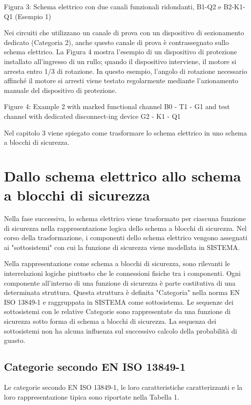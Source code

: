 \documentclass[a4paper,11pt]{article}
\begin{document}
    Figura 3: Schema elettrico con due canali funzionali ridondanti, B1-Q2 e B2-K1-Q1 (Esempio 1)

    \par\medskip\noindent Nei circuiti che utilizzano un canale di prova con un dispositivo di sezionamento dedicato (Categoria 2), anche questo canale di prova è contrassegnato sullo schema elettrico. La Figura 4 mostra l'esempio di un dispositivo di protezione installato all'ingresso di un rullo; quando il dispositivo interviene, il motore si arresta entro 1/3 di rotazione. In questo esempio, l'angolo di rotazione necessario affinché il motore si arresti viene testato regolarmente mediante l'azionamento manuale del dispositivo di protezione.

    Figure 4: Example 2 with marked functional channel B0 - T1 - G1 and test channel with dedicated disconnect-ing device G2 - K1 - Q1
    
    \par\medskip\noindent Nel capitolo 3 viene spiegato come trasformare lo schema elettrico in uno schema a blocchi di sicurezza.
    \clearpage
    
    \section{Dallo schema elettrico allo schema a blocchi di sicurezza}
    \par\medskip\noindent Nella fase successiva, lo schema elettrico viene trasformato per ciascuna funzione di sicurezza nella rappresentazione logica dello schema a blocchi di sicurezza. Nel corso della trasformazione, i componenti dello schema elettrico vengono assegnati ai "sottosistemi" con cui la funzione di sicurezza viene modellata in SISTEMA.
    
    \par\medskip\noindent Nella rappresentazione come schema a blocchi di sicurezza, sono rilevanti le interrelazioni logiche piuttosto che le connessioni fisiche tra i componenti. Ogni componente all'interno di una funzione di sicurezza è parte costitutiva di una determinata struttura. Questa struttura è definita "Categoria" nella norma EN ISO 13849-1 e raggruppata in SISTEMA come sottosistema. Le sequenze dei sottosistemi con le relative Categorie sono rappresentate da una funzione di sicurezza sotto forma di schema a blocchi di sicurezza. La sequenza dei sottosistemi non ha alcuna influenza sul successivo calcolo della probabilità di guasto.
    
    \subsection{Categorie secondo EN ISO 13849-1}
    \par\medskip\noindent Le categorie secondo EN ISO 13849-1, le loro caratteristiche caratterizzanti e la loro rappresentazione tipica sono riportate nella Tabella 1.
\end{document}
